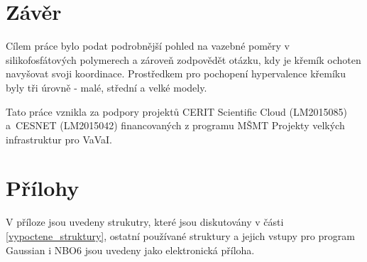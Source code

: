 \documentclass[
digital, %
table,   %
lof,     %
lot,     %
oneside,
]{fithesis3}
\begin{document}
\chapter{Závěr}
Cílem práce bylo podat podrobnější pohled na vazebné poměry v silikofosfátových polymerech a zároveň zodpovědět otázku, kdy je křemík ochoten navyšovat svoji koordinace. Prostředkem pro pochopení hypervalence křemíku byly tři úrovně - malé, střední a velké modely.



Tato práce vznikla za podpory projektů CERIT Scientific Cloud (LM2015085) a~CESNET (LM2015042) financovaných z programu MŠMT Projekty velkých infrastruktur pro VaVaI.
\newpage
\chapter{Přílohy}
V příloze jsou uvedeny strukutry, které jsou diskutovány v části \ref{vypoctene_struktury}, ostatní používané struktury a jejich vstupy pro program Gaussian i NBO6 jsou uvedeny jako elektronická příloha.
\end{document}
